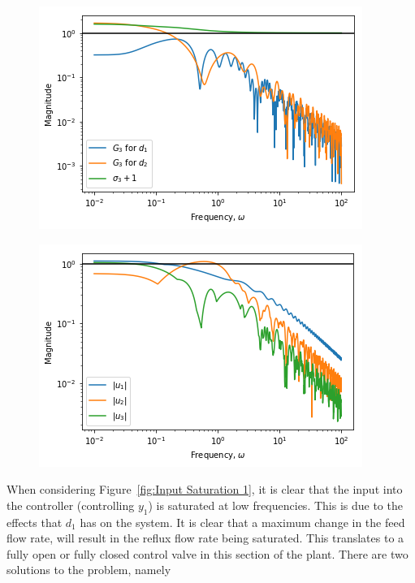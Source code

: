  \begin{figure}[H]
	\centering
	\begin{minipage}{.48\textwidth}
		\centering
		\includegraphics[width=\linewidth]{Figures/InputSaturation3}
		\label{fig:Input Saturation 3}
	\end{minipage}%
	\hfill
	\begin{minipage}{.48\textwidth}
		\centering
		\includegraphics[width=\linewidth]{Figures/Input_Requirements}
		\label{fig:Input Requirements}
	\end{minipage}
\end{figure}

When considering Figure~\ref{fig:Input Saturation 1}, it is clear that the input into the controller (controlling $y_1$) is saturated at low frequencies. This is due to the effects that $d_1$ has on the system. It is clear that a maximum change in the feed flow rate, will result in the reflux flow rate being saturated. This translates to a fully open or fully closed control valve in this section of the plant. There are two solutions to the problem, namely

